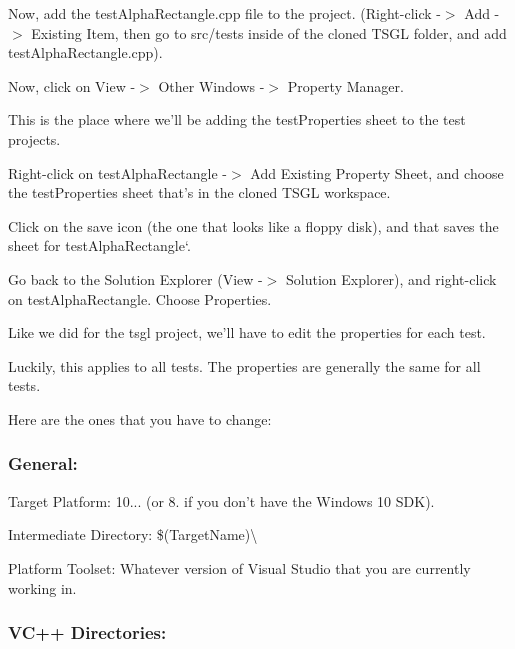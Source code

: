 Now, add the {\ttfamily test\-Alpha\-Rectangle.\-cpp} file to the project. ({\ttfamily Right-\/click -\/$>$ Add -\/$>$ Existing Item}, then go to {\ttfamily src/tests} inside of the cloned T\-S\-G\-L folder, and add {\ttfamily test\-Alpha\-Rectangle.\-cpp}).

Now, click on {\ttfamily View} -\/$>$ {\ttfamily Other Windows} -\/$>$ {\ttfamily Property Manager}.

This is the place where we'll be adding the {\ttfamily test\-Properties} sheet to the test projects.

Right-\/click on {\ttfamily test\-Alpha\-Rectangle} -\/$>$ {\ttfamily Add Existing Property Sheet}, and choose the {\ttfamily test\-Properties} sheet that's in the cloned T\-S\-G\-L workspace.

Click on the save icon (the one that looks like a floppy disk), and that saves the sheet for {\ttfamily test\-Alpha\-Rectangle}`.

Go back to the {\ttfamily Solution Explorer} ({\ttfamily View} -\/$>$ {\ttfamily Solution Explorer}), and right-\/click on {\ttfamily test\-Alpha\-Rectangle}. Choose {\ttfamily Properties}.

Like we did for the {\ttfamily tsgl} project, we'll have to edit the properties for each test.

Luckily, this applies to all tests. The properties are generally the same for all tests.

Here are the ones that you have to change\-:

\subsubsection*{General\-:}


\begin{DoxyItemize}
\item {\ttfamily Target Platform\-:} 10... (or 8. if you don't have the Windows 10 S\-D\-K).
\item {\ttfamily Intermediate Directory\-:} \$(Target\-Name)\textbackslash{}
\item {\ttfamily Platform Toolset\-:} Whatever version of Visual Studio that you are currently working in.
\end{DoxyItemize}

\subsubsection*{V\-C++ Directories\-:}


